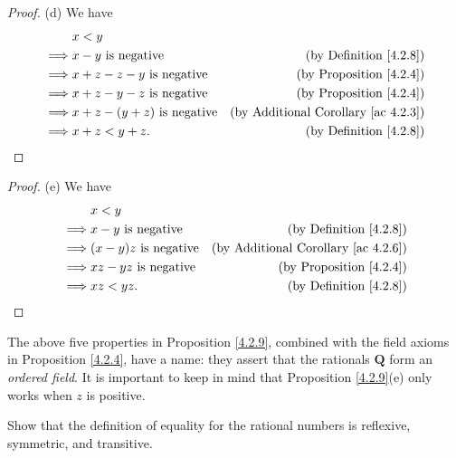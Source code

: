 \begin{proof}{(d)}
    We have
    \begin{align*}
                 & x < y                                                                                 \\
        \implies & x - y \text{ is negative}           & \text{(by Definition \ref{4.2.8})}              \\
        \implies & x + z - z - y \text{ is negative}   & \text{(by Proposition \ref{4.2.4})}             \\
        \implies & x + z - y - z \text{ is negative}   & \text{(by Proposition \ref{4.2.4})}             \\
        \implies & x + z - (y + z) \text{ is negative} & \text{(by Additional Corollary \ref{ac 4.2.3})} \\
        \implies & x + z < y + z.                      & \text{(by Definition \ref{4.2.8})}
    \end{align*}
\end{proof}

\begin{proof}{(e)}
    We have
    \begin{align*}
                 & x < y                                                                          \\
        \implies & x - y \text{ is negative}    & \text{(by Definition \ref{4.2.8})}              \\
        \implies & (x - y)z \text{ is negative} & \text{(by Additional Corollary \ref{ac 4.2.6})} \\
        \implies & xz - yz \text{ is negative}  & \text{(by Proposition \ref{4.2.4})}             \\
        \implies & xz < yz.                     & \text{(by Definition \ref{4.2.8})}
    \end{align*}
\end{proof}

\begin{remark}\label{4.2.10}
    The above five properties in Proposition \ref{4.2.9}, combined with the field axioms in Proposition \ref{4.2.4}, have a name:
    they assert that the rationals \(\mathbf{Q}\) form an \emph{ordered field}.
    It is important to keep in mind that Proposition \ref{4.2.9}(e) only works when \(z\) is positive.
\end{remark}

\exercisesection

\begin{exercise}\label{ex 4.2.1}
    Show that the definition of equality for the rational numbers is reflexive, symmetric, and transitive.
\end{exercise}

